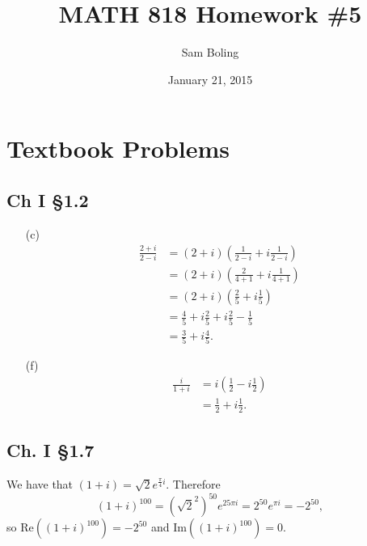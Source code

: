 \documentclass{article}
\title{MATH 818 Homework \#5}
\date{January 21, 2015}
\author{Sam Boling}
\newcounter{Problem}
\begin{document}
\begin{titlepage}
\maketitle
\end{titlepage}

\section{Textbook Problems}

\subsection*{Ch I \S 1.2}
\begin{itemize}
  \item[(c)]{
    \begin{align*}
       \frac{2 + i}{2 - i}
    &= (2+i)\left(\frac{1}{2 - i} + i\frac{1}{2 - i}\right) \\
    &= (2+i)\left(\frac{2}{4+1} + i\frac{1}{4 + 1}\right) \\
    &= (2+i)\left(\frac{2}{5} + i\frac{1}{5}\right) \\
    &= \frac{4}{5} + i\frac{2}{5} + i\frac{2}{5} - \frac{1}{5} \\
    &= \frac{3}{5} + i\frac{4}{5}.
    \end{align*}
  }
  \item[(f)]{
    \begin{align*}
       \frac{i}{1+i}
    &= i\left(\frac{1}{2} - i\frac{1}{2}\right) \\
    &= \frac{1}{2} + i\frac{1}{2}.
    \end{align*}
  }
\end{itemize}

\subsection*{Ch. I \S 1.7}
We have that $(1 + i) = \sqrt{2}e^{\frac{\pi}{4} i}$.
Therefore
$$
  (1 + i)^{100}
= (\sqrt{2}^2)^{50} e^{25 \pi i}
= 2^{50} e^{\pi i}
= -2^{50},
$$
so $\mathrm{Re}((1 + i)^{100}) = -2^{50}$ and
$\mathrm{Im}((1 + i)^{100}) = 0$.
\end{document}
